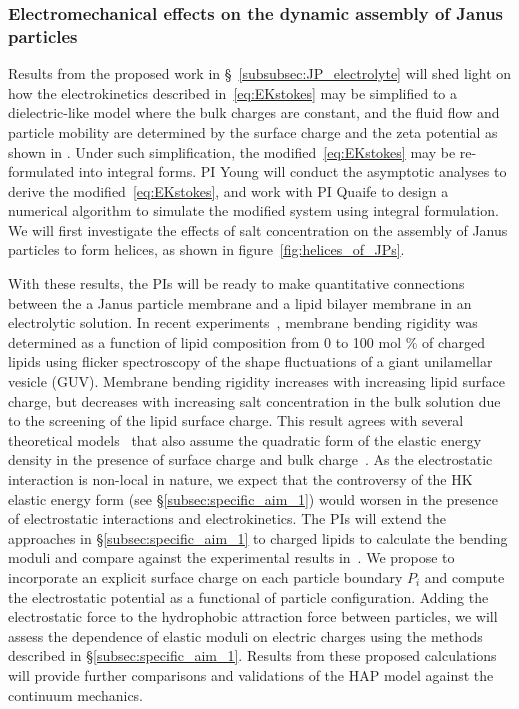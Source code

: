 \subsubsection{Electromechanical effects on the dynamic assembly of Janus particles \label{subsubsec:em_effects}}
Results from the proposed work in \S~\ref{subsubsec:JP_electrolyte} will shed light on how the electrokinetics described in~\eqref{eq:EKstokes}
may be simplified to a dielectric-like model where the bulk charges are constant, and the fluid flow and particle mobility are determined by the surface charge and the zeta potential as shown in \cite{Mori2018_JFM}. Under such simplification, the modified~\eqref{eq:EKstokes} may be re-formulated into integral forms. PI Young will conduct the asymptotic analyses to derive the modified~\eqref{eq:EKstokes}, and work with PI Quaife to design a numerical algorithm to simulate the modified system using integral formulation. We will first investigate the effects of salt concentration on the assembly of Janus particles to form helices, as shown in figure~\ref{fig:helices_of_JPs}.

With these results, the PIs will be ready to make quantitative connections between the a Janus particle membrane and a lipid bilayer membrane in an electrolytic solution. In recent experiments~\cite{FaizEtAl2019_SoftMatt}, membrane bending
rigidity was determined as a function of lipid composition from 0 to 100
mol $\%$ of charged lipids using flicker spectroscopy of the shape
fluctuations of a giant unilamellar vesicle (GUV).
Membrane bending rigidity increases with increasing lipid surface
charge, but decreases with increasing salt concentration in the bulk
solution due to the screening of the lipid surface charge. This
result agrees
with several theoretical models~\cite{Kralchevsky1996_JCIS,
May1996_JChemPhys, LoubetEtAl2013_PRE} that also assume the quadratic
form of the elastic energy density in the presence of surface charge and
bulk charge~\cite{DuplantierGoldstein1990_PRL, Winterhalter1992_JPC}. As
the electrostatic interaction is non-local in nature, we expect that the
controversy of the HK elastic energy form (see
\S\ref{subsec:specific_aim_1}) would worsen in the presence of
electrostatic interactions and electrokinetics. The PIs will extend the
approaches in \S\ref{subsec:specific_aim_1} to charged lipids to
calculate the bending moduli and compare against the experimental
results in~\cite{FaizEtAl2019_SoftMatt}. We propose to incorporate an
explicit surface charge on each particle boundary $P_i$ and compute the
electrostatic potential as a functional of particle configuration.
Adding the electrostatic force to the hydrophobic attraction force
between particles, we will assess the dependence of elastic moduli on
electric charges using the methods described in
\S\ref{subsec:specific_aim_1}. Results from these proposed calculations
will provide further comparisons and validations of the HAP model
against the continuum mechanics.

